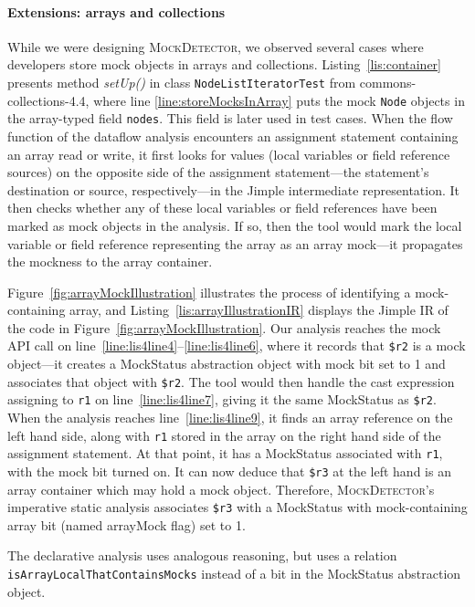 \paragraph{Extensions: arrays and collections} While we were designing \textsc{MockDetector}, we observed several cases where developers store mock objects in arrays and collections. Listing~\ref{lis:container} presents method \textit{setUp()} in class \texttt{NodeListIteratorTest} from commons-collections-4.4, where line \ref{line:storeMocksInArray} puts the mock \texttt{Node} objects in the array-typed field \texttt{nodes}. This field is later used in test cases. When the flow function of the dataflow analysis encounters an assignment statement containing an array read or write, it first looks for values (local variables or field reference sources) on the opposite side of the assignment statement---the statement's destination or source, respectively---in the Jimple intermediate representation. It then checks whether any of these local variables or field references have been marked as mock objects in the analysis. If so, then the tool would mark the local variable or field reference representing the array as an array mock---it propagates the mockness to the array container.

Figure~\ref{fig:arrayMockIllustration} illustrates the process of identifying a mock-containing array, and Listing~\ref{lis:arrayIllustrationIR} displays the Jimple IR of the code in Figure~\ref{fig:arrayMockIllustration}. Our analysis reaches the mock API call on line~\ref{line:lis4line4}--\ref{line:lis4line6}, where it records that \texttt{\$r2} is a mock object---it creates a MockStatus abstraction object with mock bit set to 1 and associates that object with \texttt{\$r2}. The tool would then handle the cast expression assigning to \texttt{r1} on line~\ref{line:lis4line7}, giving it the same MockStatus as \texttt{\$r2}. When the analysis reaches line~\ref{line:lis4line9}, it finds an array reference on the left hand side, along with \texttt{r1} stored in the array on the right hand side of the assignment statement. At that point, it has a MockStatus associated with \texttt{r1}, with the mock bit turned on. It can now deduce that \texttt{\$r3} at the left hand is an array container which may hold a mock object. Therefore, \textsc{MockDetector}'s imperative static analysis associates \texttt{\$r3} with a MockStatus with mock-containing array bit (named arrayMock flag) set to 1.

The declarative analysis uses analogous reasoning, but uses a relation \texttt{isArrayLocalThatContainsMocks} instead of a bit in the MockStatus abstraction object.

